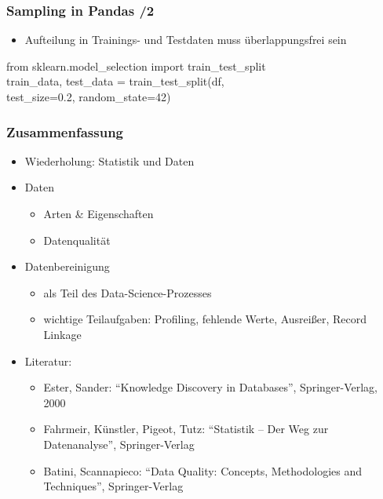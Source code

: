     
    \begin{frame}
    \frametitle{Sampling in Pandas /2}
    
    \begin{itemize}
    \item Aufteilung in Trainings- und Testdaten muss überlappungsfrei sein
    \end{itemize}
    
    \begin{python}
    from sklearn.model\_selection import train\_test\_split \\
    train\_data, test\_data = train\_test\_split(df, \\
    \1 test\_size=0.2, random\_state=42)
    \end{python}
    \end{frame}
    
    \begin{frame}
    \frametitle{Zusammenfassung}
    
    \begin{itemize}
    \item Wiederholung: Statistik und Daten
    \item Daten
    \begin{itemize}
    \item Arten \& Eigenschaften
    \item Datenqualität
    \end{itemize}
    \item Datenbereinigung
    \begin{itemize}
    \item als Teil des Data-Science-Prozesses
    \item wichtige Teilaufgaben: Profiling, fehlende Werte, Ausreißer,
      Record Linkage
    \end{itemize}
    \item Literatur: 
    \begin{itemize}
    \item Ester, Sander: "`Knowledge Discovery in Databases"',
      Springer-Verlag, 2000
    \item Fahrmeir, Künstler, Pigeot, Tutz: "`Statistik -- Der Weg zur
      Datenanalyse"', Springer-Verlag  
    \item Batini, Scannapieco: "`Data Quality: Concepts, Methodologies and
      Techniques"', Springer-Verlag
    \end{itemize}
    \end{itemize}
    
    \end{frame}
    